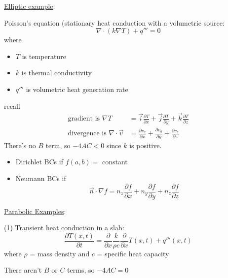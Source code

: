 \documentclass[12pt]{article}
\begin{document}
\vspace*{1em}
\noindent \underline{Elliptic example}:

Poisson's equation (stationary heat conduction with a volumetric source:
%
\begin{equation}
\nabla \cdot (k \nabla T) + q''' = 0 \nonumber
\end{equation}
% 
where
\begin{itemize}
\item $T$ is temperature
\item $k$ is thermal conductivity
\item $q'''$ is volumetric heat generation rate
\end{itemize}
%
recall
%
\begin{align}
\text{gradient is } \nabla T &= \vec{i}\frac{\partial T}{\partial x} + \vec{j}\frac{\partial T}{\partial y} + \vec{k}\frac{\partial T}{\partial z} \nonumber \\
%
\text{divergence is } \nabla \cdot \vec{v} &= \frac{\partial v_x}{\partial x} + \frac{\partial v_y}{\partial y} + \frac{\partial v_z}{\partial z} \nonumber
\end{align}
%
There's no $B$ term, so $-4AC < 0$ since $k$ is positive.

\begin{itemize}
\item Dirichlet BCs if $f(a,b) =$ constant
\item Neumann BCs if 
\begin{equation}
\vec{n} \cdot \nabla f = n_x \frac{\partial f} {\partial x} + n_y \frac{\partial f} {\partial y}  +n_z \frac{\partial f} {\partial z} \nonumber
\end{equation}
\end{itemize}

\vspace*{1em}
\noindent \underline{Parabolic Examples}:

(1) Transient heat conduction in a slab:
%
\begin{equation}
\frac{\partial T(x,t)}{\partial t} = \frac{\partial}{\partial x} \frac{k}{\rho c} \frac{\partial}{\partial x} T(x,t) + q'''(x,t) \nonumber
\end{equation}
%
where $\rho$ = mass density and $c$ = specific heat capacity

\noindent There aren't $B$ or $C$ terms, so $-4AC = 0$
\end{document}

